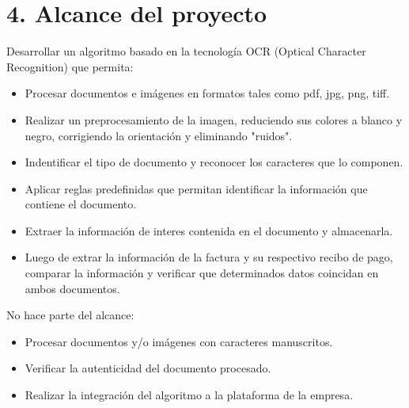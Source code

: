 \documentclass[
11pt, %
]{charter}
\begin{document}
\begin{•}
\begin{•}
\end{•}

\section{4. Alcance del proyecto}
\label{sec:alcance}

\begin{•}%




Desarrollar un algoritmo basado en la tecnología OCR (Optical Character Recognition) que permita:
\begin{itemize}
\item Procesar documentos e imágenes en formatos tales como pdf, jpg, png, tiff.
\item Realizar un preprocesamiento de la imagen, reduciendo sus colores a blanco y negro, corrigiendo la orientación y eliminando "ruidos".
\item Indentificar el tipo de documento y reconocer los caracteres que lo componen.
\item Aplicar reglas predefinidas que permitan identificar la información que contiene el documento.
\item Extraer la información de interes contenida en el documento y almacenarla.
\item Luego de extrar la información de la factura y su respectivo recibo de pago, comparar la información y verificar que determinados datos coincidan en ambos documentos.
\end{itemize}

No hace parte del alcance:
\begin{itemize}
\item Procesar documentos y/o imágenes con caracteres manuscritos.
\item Verificar la autenticidad del documento procesado.
\item Realizar la integración del algoritmo a la plataforma de la empresa.
\end{itemize}

\end{•}



\end{•}
\end{document}
